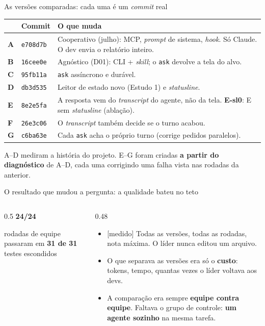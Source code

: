 \documentclass[11pt,aspectratio=169]{beamer}
\newcommand{\ev}[2]{{\scriptsize\sffamily\colorbox{#1!12}{\textcolor{#1!80!black}{[#2]}}}}
\newcommand{\medido}{\ev{ok}{medido}}
\begin{document}
\begin{frame}{As versões comparadas: cada uma é um \emph{commit} real}
\small
\begin{tabularx}{\linewidth}{@{}l l X@{}}
\toprule
& Commit & O que muda \\
\midrule
\textbf{A} & \texttt{e708d7b} & Cooperativo (julho): MCP, \emph{prompt} de sistema, \emph{hook}. Só Claude. O dev envia o relatório inteiro. \\
\textbf{B} & \texttt{16cee0e} & Agnóstico (D01): CLI + \emph{skill}; o \texttt{ask} devolve a tela do alvo. \\
\textbf{C} & \texttt{95fb11a} & \texttt{ask} assíncrono e durável. \\
\textbf{D} & \texttt{db3d535} & Leitor de estado novo (Estudo 1) e \emph{statusline}. \\
\midrule
\textbf{E} & \texttt{8e2e5fa} & A resposta vem do \emph{transcript} do agente, não da tela. \quad \textbf{E-sl0}: E sem \emph{statusline} (ablação). \\
\textbf{F} & \texttt{26e3c06} & O \emph{transcript} também decide se o turno acabou. \\
\textbf{G} & \texttt{c6ba63e} & Cada \texttt{ask} acha o próprio turno (corrige pedidos paralelos). \\
\bottomrule
\end{tabularx}
\vspace{0.6em}

{\small A--D mediram a história do projeto. E--G foram criadas \textbf{a partir do diagnóstico} de A--D, cada uma corrigindo
uma falha vista nas rodadas da anterior.}
\end{frame}

\begin{frame}{O resultado que mudou a pergunta: a qualidade bateu no teto}
\begin{columns}[c]
\begin{column}{0.5\linewidth}
\centering
{\fontsize{44}{48}\selectfont\color{acento}\textbf{24/24}}\par
\vspace{0.3em}
{\small rodadas de equipe passaram em \textbf{31 de 31} testes escondidos}
\end{column}
\begin{column}{0.48\linewidth}
\small
\begin{itemize}\setlength\itemsep{0.5em}
\item \medido{} Todas as versões, todas as rodadas, nota máxima. O líder nunca editou um arquivo.
\item O que separava as versões era só o \textbf{custo}: tokens, tempo, quantas vezes o líder voltava aos devs.
\item A comparação era sempre \textbf{equipe contra equipe}. Faltava o grupo de controle:
  \textbf{um agente sozinho} na mesma tarefa.
\end{itemize}
\end{column}
\end{columns}
\end{frame}
\end{document}
